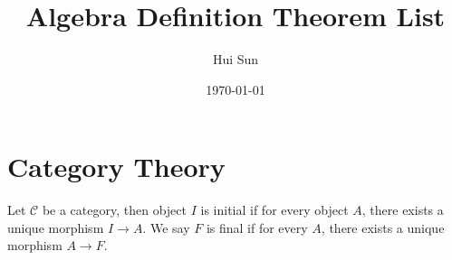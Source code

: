 \documentclass[openany]{book}
\title{Algebra Definition Theorem List}
\date{\today}
\author{Hui Sun}
\begin{document}
\maketitle

\tableofcontents
\newpage



\chapter{Category Theory}
\begin{defn}
    Let $\mathcal{C}$ be a category, then object $I$ is initial if for every object $A$, there exists a unique morphism $I\to A$. We say $F$ is final if for every $A$, there exists a unique morphism $A\to F$.
\end{defn}












\end{document}
